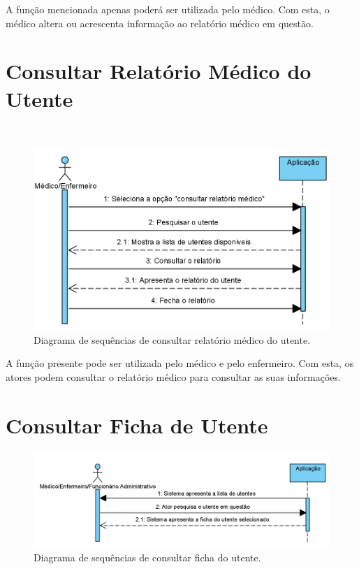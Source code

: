 \documentclass[11pt,a4paper,twoside]{report}
\begin{document}
A função mencionada apenas poderá ser utilizada pelo médico.
Com esta, o médico altera ou acrescenta informação ao relatório médico em questão. 


\section{Consultar Relatório Médico do Utente }


~\begin{figure}[H]
	\centering
	\includegraphics[width=0.7\linewidth]{image/SequencialDiagramsImages/Consultar_relatorio}
	\caption [Diagrama de sequências de consultar relatório médico do utente.] {Diagrama de sequências de consultar relatório médico do utente.}
	\label{fig:consultarrelatorioF}
\end{figure}

A função presente pode ser utilizada pelo médico e pelo enfermeiro. Com esta, os atores podem consultar o relatório médico para consultar as suas informações.

\section{Consultar Ficha de Utente }

\begin{figure}[H]
	\centering
	\includegraphics[width=0.7\linewidth]{image/SequencialDiagramsImages/Consultar_ficha_utente}
	\caption [Diagrama de sequências de consultar ficha do utente.] {Diagrama de sequências de consultar ficha do utente.}
	\label{fig:consultarfichautenteF}
\end{figure}
\end{document}
